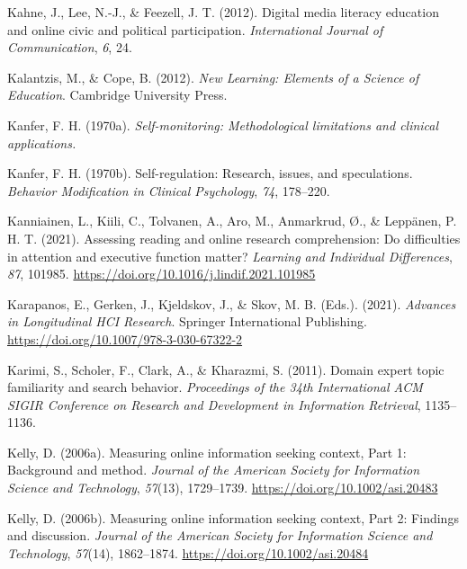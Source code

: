 \documentclass[letterpaper, nobind]{templates/ociamthesis}
\newlength{\cslhangindent}
\newenvironment{CSLReferences}[2] %
 {%
  \setlength{\parindent}{0pt}
  \ifodd #1
  \let\oldpar\par
  \def\par{\hangindent=\cslhangindent\oldpar}
  \fi
  \setlength{\parskip}{1mm}
  \setlength{\baselineskip}{6mm}
 }%
 {}
\begin{document}
\begin{CSLReferences}{1}{0}
\leavevmode{}%
Kahne, J., Lee, N.-J., \& Feezell, J. T. (2012). Digital media literacy education and online civic and political participation. \emph{International Journal of Communication}, \emph{6}, 24.

\leavevmode{}%
Kalantzis, M., \& Cope, B. (2012). \emph{New {Learning}: Elements of a {Science} of {Education}}. {Cambridge University Press}.

\leavevmode{}%
Kanfer, F. H. (1970a). \emph{Self-monitoring: Methodological limitations and clinical applications.}

\leavevmode{}%
Kanfer, F. H. (1970b). Self-regulation: Research, issues, and speculations. \emph{Behavior Modification in Clinical Psychology}, \emph{74}, 178--220.

\leavevmode{}%
Kanniainen, L., Kiili, C., Tolvanen, A., Aro, M., Anmarkrud, Ø., \& Leppänen, P. H. T. (2021). Assessing reading and online research comprehension: Do difficulties in attention and executive function matter? \emph{Learning and Individual Differences}, \emph{87}, 101985. \url{https://doi.org/10.1016/j.lindif.2021.101985}

\leavevmode{}%
Karapanos, E., Gerken, J., Kjeldskov, J., \& Skov, M. B. (Eds.). (2021). \emph{Advances in {Longitudinal HCI Research}}. {Springer International Publishing}. \url{https://doi.org/10.1007/978-3-030-67322-2}

\leavevmode{}%
Karimi, S., Scholer, F., Clark, A., \& Kharazmi, S. (2011). Domain expert topic familiarity and search behavior. \emph{Proceedings of the 34th International ACM SIGIR Conference on Research and Development in Information Retrieval}, 1135--1136.

\leavevmode{}%
Kelly, D. (2006a). Measuring online information seeking context, {Part} 1: Background and method. \emph{Journal of the American Society for Information Science and Technology}, \emph{57}(13), 1729--1739. \url{https://doi.org/10.1002/asi.20483}

\leavevmode{}%
Kelly, D. (2006b). Measuring online information seeking context, {Part} 2: Findings and discussion. \emph{Journal of the American Society for Information Science and Technology}, \emph{57}(14), 1862--1874. \url{https://doi.org/10.1002/asi.20484}


\end{CSLReferences}
\end{document}
